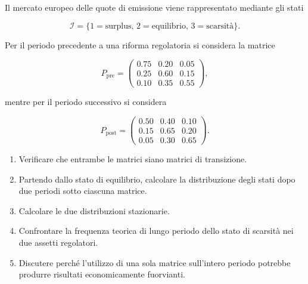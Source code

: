 \begin{exercise}
Il mercato europeo delle quote di emissione viene rappresentato
mediante gli stati

\[
\mathcal{I}
=
\{
1=\text{surplus},
\,
2=\text{equilibrio},
\,
3=\text{scarsit\`{a}}
\}.
\]

Per il periodo precedente a una riforma regolatoria si considera la
matrice

\[
P_{\mathrm{pre}}
=
\begin{pmatrix}
0.75&0.20&0.05\\
0.25&0.60&0.15\\
0.10&0.35&0.55
\end{pmatrix},
\]

mentre per il periodo successivo si considera

\[
P_{\mathrm{post}}
=
\begin{pmatrix}
0.50&0.40&0.10\\
0.15&0.65&0.20\\
0.05&0.30&0.65
\end{pmatrix}.
\]

\begin{enumerate}

\item Verificare che entrambe le matrici siano matrici di transizione.

\item Partendo dallo stato di equilibrio, calcolare la distribuzione
degli stati dopo due periodi sotto ciascuna matrice.

\item Calcolare le due distribuzioni stazionarie.

\item Confrontare la frequenza teorica di lungo periodo dello stato di
scarsit\`{a} nei due assetti regolatori.

\item Discutere perch\'{e} l'utilizzo di una sola matrice sull'intero
periodo potrebbe produrre risultati economicamente fuorvianti.
\end{enumerate}
\end{exercise}

